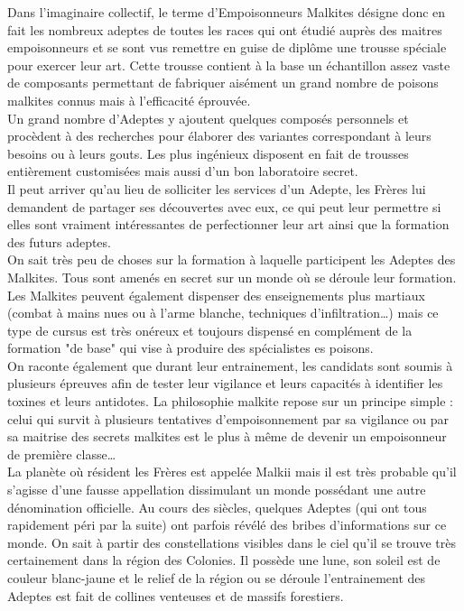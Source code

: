 \documentclass[twoside]{article}
\begin{document}
Dans l'imaginaire collectif, le terme d'Empoisonneurs Malkites désigne donc en fait les nombreux adeptes de toutes les races qui ont étudié auprès des maitres empoisonneurs et se sont vus remettre en guise de diplôme une trousse spéciale pour exercer leur art. Cette trousse contient à la base un échantillon assez vaste de composants permettant de fabriquer aisément un grand nombre de poisons malkites connus mais à l'efficacité éprouvée.\\

Un grand nombre d'Adeptes y ajoutent quelques composés personnels et procèdent à des recherches pour élaborer des variantes correspondant à leurs besoins ou à leurs gouts. Les plus ingénieux disposent en fait de trousses entièrement customisées mais aussi d'un bon laboratoire secret.\\

Il peut arriver qu'au lieu de solliciter les services d'un Adepte, les Frères lui demandent de partager ses découvertes avec eux, ce qui peut leur permettre si elles sont vraiment intéressantes de perfectionner leur art ainsi que la formation des futurs adeptes.\\

On sait très peu de choses sur la formation à laquelle participent les Adeptes des Malkites. Tous sont amenés en secret sur un monde où se déroule leur formation. Les Malkites peuvent également dispenser des enseignements plus martiaux (combat à mains nues ou à l'arme blanche, techniques d'infiltration\ldots) mais ce type de cursus est très onéreux et toujours dispensé en complément de la formation "de base" qui vise à produire des spécialistes es poisons.\\

On raconte également que durant leur entrainement, les candidats sont soumis à plusieurs épreuves afin de tester leur vigilance et leurs capacités à identifier les toxines et leurs antidotes. La philosophie malkite repose sur un principe simple : celui qui survit à plusieurs tentatives d'empoisonnement par sa vigilance ou par sa maitrise des secrets malkites est le plus à même de devenir un empoisonneur de première classe\ldots\\

La planète où résident les Frères est appelée Malkii mais il est très probable qu'il s'agisse d'une fausse appellation dissimulant un monde possédant une autre dénomination officielle. Au cours des siècles, quelques Adeptes (qui ont tous rapidement péri par la suite) ont parfois révélé des bribes d'informations sur ce monde. On sait à partir des constellations visibles dans le ciel qu'il se trouve très certainement dans la région des Colonies. Il possède une lune, son soleil est de couleur blanc-jaune et le relief  de la région ou se déroule l'entrainement des Adeptes est fait de collines venteuses et de massifs forestiers.\\
\end{document}
